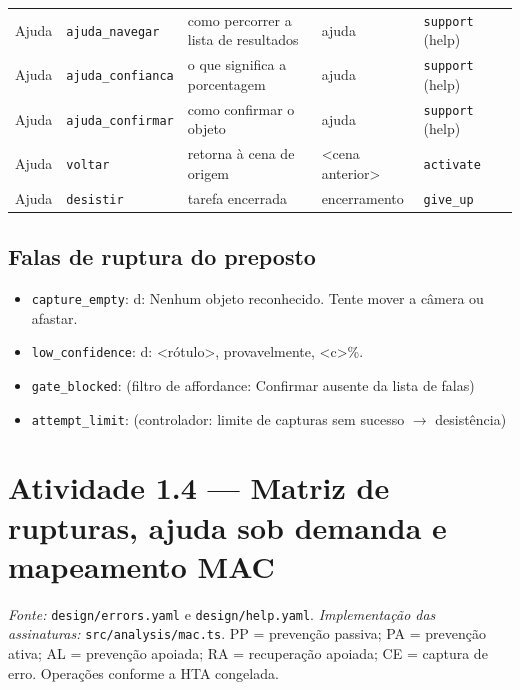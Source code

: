 \documentclass[a4paper,10pt]{article}
\begin{document}
\begin{longtable}{l l L{7.5cm} L{2.6cm} L{3.4cm} L{5.2cm}}
Ajuda & \texttt{ajuda\_navegar} & como percorrer a lista de resultados & ajuda & \texttt{support} (help) & \\
Ajuda & \texttt{ajuda\_confianca} & o que significa a porcentagem & ajuda & \texttt{support} (help) & \\
Ajuda & \texttt{ajuda\_confirmar} & como confirmar o objeto & ajuda & \texttt{support} (help) & \\
Ajuda & \texttt{voltar} & retorna à cena de origem & <cena anterior> & \texttt{activate} & \\
Ajuda & \texttt{desistir} & tarefa encerrada & encerramento & \texttt{give\_up} & \\
\bottomrule
\end{longtable}

\subsection*{Falas de ruptura do preposto}
\begin{itemize}\setlength\itemsep{0pt}
\item \texttt{capture\_empty}: d: Nenhum objeto reconhecido. Tente mover a câmera ou afastar.
\item \texttt{low\_confidence}: d: <rótulo>, provavelmente, <c>\%.
\item \texttt{gate\_blocked}: (filtro de affordance: Confirmar ausente da lista de falas)
\item \texttt{attempt\_limit}: (controlador: limite de capturas sem sucesso $\rightarrow$ desistência)
\end{itemize}

\section{Atividade 1.4 --- Matriz de rupturas, ajuda sob demanda e mapeamento MAC}
\emph{Fonte:} \texttt{design/errors.yaml} e \texttt{design/help.yaml}. \emph{Implementação das assinaturas:} \texttt{src/analysis/mac.ts}. PP = prevenção passiva; PA = prevenção ativa; AL = prevenção apoiada; RA = recuperação apoiada; CE = captura de erro. Operações conforme a HTA congelada.
\end{document}
